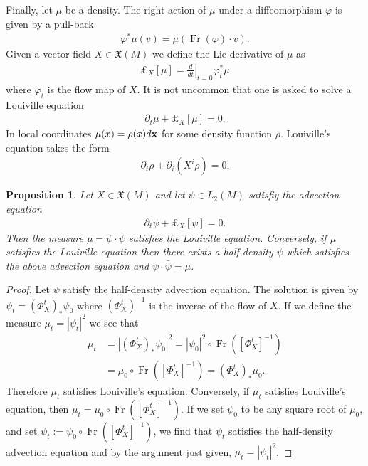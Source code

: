 \documentclass[12pt]{amsart}
\newtheorem{prop}{Proposition}
\DeclareMathOperator{\Fr}{Fr}
\begin{document}
Finally, let $\mu$ be a density.  The right action of $\mu$ under a diffeomorphism $\varphi$ is given by a pull-back
\begin{align*}
  \varphi^* \mu (v) = \mu ( \Fr(\varphi) \cdot v).
\end{align*}
Given a vector-field $X \in \mathfrak{X}(M)$ we define the Lie-derivative
of $\mu$ as
\begin{align*}
  \pounds_X[ \mu] = \left. \frac{d}{dt} \right|_{t=0} \varphi_t^* \mu
\end{align*}
where $\varphi_t$ is the flow map of $X$.
It is not uncommon that one is asked to solve a Louiville equation
\begin{align*}
  \partial_t \mu + \pounds_X[\mu] = 0.
\end{align*}
In local coordinates $\mu(x) = \rho(x) d {\bf x}$ for some density function $\rho$.  Louiville's equation takes the form
\begin{align*}
  \partial_t \rho + \partial_i ( X^i \rho) = 0.
\end{align*}
\begin{prop}
  Let $X \in \mathfrak{X}(M)$ and let $\psi \in L_2(M)$ satisfiy the advection equation
  \begin{align*}
    \partial_t \psi + \pounds_X[\psi] = 0.
  \end{align*}
  Then the measure $\mu = \psi \cdot \bar{\psi}$ satisfies the Louiville equation.  Conversely, if $\mu$ satisfies the Louiville equation then there exists a half-density $\psi$ which satisfies the above advection equation and $\psi \cdot \bar{\psi} = \mu$.
\end{prop}
\begin{proof}
  Let $\psi$ satisfy the half-density advection equation.
  The solution is given by $\psi_t = (\Phi_X^t)_*\psi_0$
  where $(\Phi_X^{t})^{-1}$ is the inverse of the flow of $X$.
  If we define the measure $\mu_t = |\psi_t |^2$
  we see that
  \begin{align*}
    \mu_t &= | (\Phi_X^t)_* \psi_0 |^2 = | \psi_0 |^2 \circ \Fr([\Phi_X^t]^{-1}) \\
    &= \mu_0 \circ \Fr( [\Phi_X^t]^{-1}) = (\Phi_X^{t})_* \mu_0.
  \end{align*}
  Therefore $\mu_t$ satisfies Louiville's equation.
  Conversely, if $\mu_t$ satisfies Louiville's equation,
  then $\mu_t = \mu_0 \circ \Fr([\Phi_X^t]^{-1})$.
  If we set $\psi_0$ to be any square root of $\mu_0$,
  and set $\psi_t := \psi_0 \circ \Fr([\Phi_X^t]^{-1})$, we find
  that $\psi_t$ satisfies the half-density advection equation
  and by the argument just given, $\mu_t = |\psi_t|^2$.
\end{proof}
\end{document}
